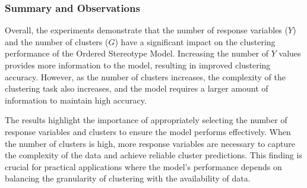 \documentclass{article}
\begin{document}
\subsubsection*{Summary and Observations}

Overall, the experiments demonstrate that the number of response variables (\( Y \)) and the number of clusters (\( G \)) have a significant impact on the clustering performance of the Ordered Stereotype Model. 
Increasing the number of \( Y \) values provides more information to the model, resulting in improved clustering accuracy. 
However, as the number of clusters increases, the complexity of the clustering task also increases, and the model requires a larger amount of information to maintain high accuracy.

The results highlight the importance of appropriately selecting the number of response variables and clusters to ensure the model performs effectively. 
When the number of clusters is high, more response variables are necessary to capture the complexity of the data and achieve reliable cluster predictions. 
This finding is crucial for practical applications where the model's performance depends on balancing the granularity of clustering with the availability of data.
\end{document}
